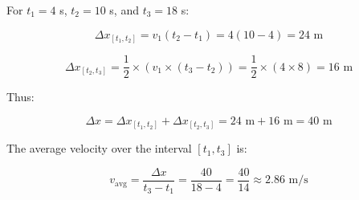 \documentclass{article}
\begin{document}
For $t_1 = 4$ s, $t_2 = 10$ s, and $t_3 = 18$ s:

\[
\Delta x_{[t_1, t_2]} = v_1(t_2 - t_1) = 4(10 - 4) = 24 \text{ m}
\]

\[
\Delta x_{[t_2, t_3]} = \frac{1}{2} \times (v_1 \times (t_3 - t_2)) = \frac{1}{2} \times (4 \times 8) = 16 \text{ m}
\]

Thus:

\[
\Delta x = \Delta x_{[t_1, t_2]} + \Delta x_{[t_2, t_3]} = 24 \text{ m} + 16 \text{ m} = 40 \text{ m}
\]

The average velocity over the interval $[t_1, t_3]$ is:

\[
v_{\text{avg}} = \frac{\Delta x}{t_3 - t_1} = \frac{40}{18 - 4} = \frac{40}{14} \approx 2.86 \text{ m/s}
\]
\end{document}
